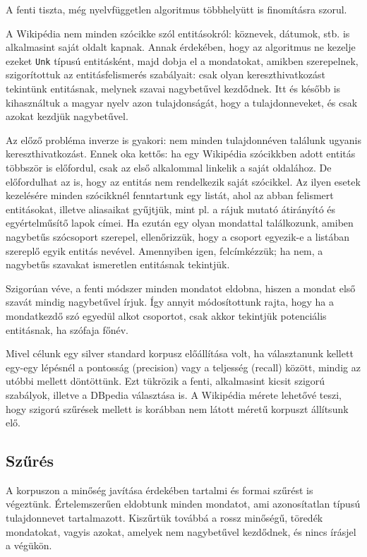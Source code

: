 \documentclass{llncs}
\begin{document}
A fenti tiszta, még nyelvfüggetlen algoritmus többhelyütt is finomításra szorul.

A Wikipédia nem minden szócikke szól entitásokról: köznevek, dátumok, stb. is
alkalmasint saját oldalt kapnak. Annak érdekében, hogy az algoritmus ne
kezelje ezeket \texttt{Unk} típusú entitásként, majd dobja el a mondatokat,
amikben szerepelnek, szigorítottuk az entitásfelismerés szabályait: csak olyan
kereszthivatkozást tekintünk entitásnak, melynek szavai nagybetűvel kezdődnek.
Itt és később is kihasználtuk a magyar nyelv azon tulajdonságát, hogy a
tulajdonneveket, és csak azokat kezdjük nagybetűvel.

Az előző probléma inverze is gyakori: nem minden tulajdonnéven találunk ugyanis
kereszthivatkozást. Ennek oka kettős: ha egy Wikipédia szócikkben adott entitás
többször is előfordul, csak az első alkalommal linkelik a saját oldalához. De
előfordulhat az is, hogy az entitás nem rendelkezik saját szócikkel. Az ilyen
esetek kezelésére minden szócikknél fenntartunk egy listát, ahol az abban
felismert entitásokat, illetve aliasaikat gyűjtjük, mint pl. a rájuk mutató
átirányító és egyértelműsítő lapok címei. Ha ezután egy olyan mondattal
találkozunk, amiben nagybetűs szócsoport szerepel, ellenőrizzük, hogy a csoport
egyezik-e a listában szereplő egyik entitás nevével. Amennyiben igen,
felcímkézzük; ha nem, a nagybetűs szavakat ismeretlen entitásnak tekintjük.

Szigorúan véve, a fenti módszer minden mondatot eldobna, hiszen a mondat első
szavát mindig nagybetűvel írjuk. Így annyit módosítottunk rajta, hogy ha a
mondatkezdő szó egyedül alkot csoportot, csak akkor tekintjük potenciális
entitásnak, ha szófaja főnév.

Mivel célunk egy silver standard korpusz előállítása volt, ha választanunk
kellett egy-egy lépésnél a pontosság (precision) vagy a teljesség (recall)
között, mindig az utóbbi mellett döntöttünk. Ezt tükrözik a fenti, alkalmasint
kicsit szigorú szabályok, illetve a DBpedia választása is. A Wikipédia mérete
lehetővé teszi, hogy szigorú szűrések mellett is korábban nem látott méretű
korpuszt állítsunk elő.

\subsection{Szűrés}

A korpuszon a minőség javítása érdekében tartalmi és formai szűrést is
végeztünk. Értelemszerűen eldobtunk minden mondatot, ami azonosítatlan típusú
tulajdonnevet tartalmazott. Kiszűrtük továbbá a rossz minőségű, töredék
mondatokat, vagyis azokat, amelyek nem nagybetűvel kezdődnek, és nincs írásjel
a végükön.
\end{document}
